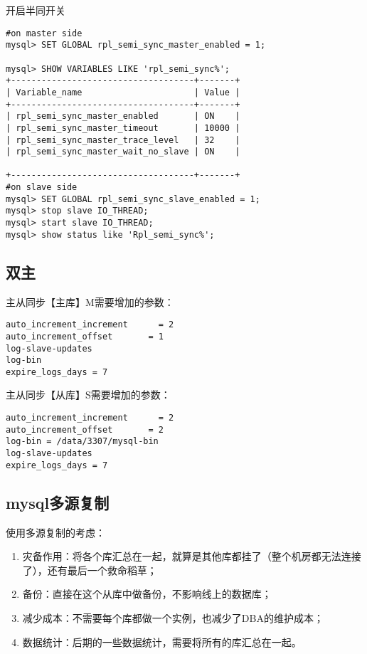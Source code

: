 开启半同开关
\begin{lstlisting}
#on master side
mysql> SET GLOBAL rpl_semi_sync_master_enabled = 1;
 
mysql> SHOW VARIABLES LIKE 'rpl_semi_sync%';      
+------------------------------------+-------+
| Variable_name                      | Value | 
+------------------------------------+-------+
| rpl_semi_sync_master_enabled       | ON    | 
| rpl_semi_sync_master_timeout       | 10000 | 
| rpl_semi_sync_master_trace_level   | 32    | 
| rpl_semi_sync_master_wait_no_slave | ON    | 

+------------------------------------+-------+
#on slave side
mysql> SET GLOBAL rpl_semi_sync_slave_enabled = 1;
mysql> stop slave IO_THREAD;
mysql> start slave IO_THREAD; 
mysql> show status like 'Rpl_semi_sync%';
\end{lstlisting}

\subsection{双主}

主从同步【主库】M需要增加的参数：
\begin{lstlisting}
auto_increment_increment      = 2 
auto_increment_offset       = 1 
log-slave-updates 
log-bin 
expire_logs_days = 7 
\end{lstlisting}
主从同步【从库】S需要增加的参数：
\begin{lstlisting}
auto_increment_increment      = 2 
auto_increment_offset       = 2 
log-bin = /data/3307/mysql-bin 
log-slave-updates 
expire_logs_days = 7 
\end{lstlisting}

\subsection{mysql多源复制}

使用多源复制的考虑：
\begin{enumerate}
\item 灾备作用：将各个库汇总在一起，就算是其他库都挂了（整个机房都无法连接了），还有最后一个救命稻草；
\item 备份：直接在这个从库中做备份，不影响线上的数据库；
\item 减少成本：不需要每个库都做一个实例，也减少了DBA的维护成本；
\item 数据统计：后期的一些数据统计，需要将所有的库汇总在一起。
\end{enumerate}

